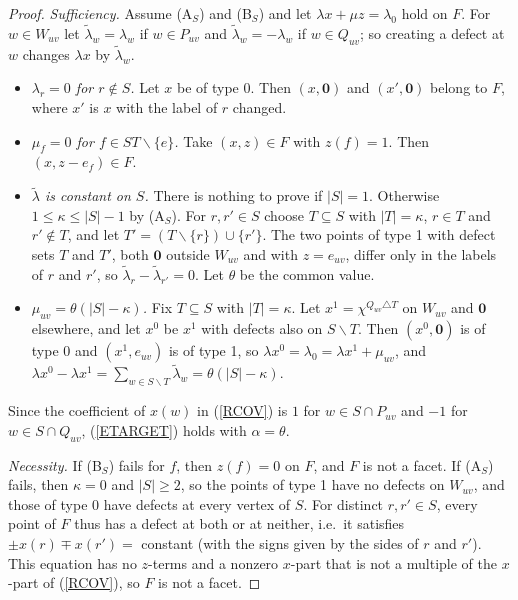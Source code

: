 \documentclass[a4paper,11pt]{article}
\newcommand{\ie}{{i.e.~}}
\theoremstyle{definition}
\begin{document}
\begin{proof}
\emph{Sufficiency.} Assume (A$_S$) and (B$_S$) and let $\lambda x + \mu z = \lambda_0$ hold on $F$. For $w \in W_{uv}$ let
$\tilde{\lambda}_w = \lambda_w$ if $w \in P_{uv}$ and $\tilde{\lambda}_w = -\lambda_w$ if $w \in Q_{uv}$; so creating a defect at $w$ changes $\lambda x$ by
$\tilde{\lambda}_w$.
\begin{itemize}
\item \emph{$\lambda_r = 0$ for $r \notin S$.} Let $x$ be of type 0. Then $(x, \mathbf{0})$ and $(x', \mathbf{0})$ belong to $F$, where $x'$ is $x$ with the label of
$r$ changed.
\item \emph{$\mu_f = 0$ for $f \in ST \backslash \{e\}$.} Take $(x, z) \in F$ with $z(f) = 1$. Then $(x, z - e_f) \in F$.
\item \emph{$\tilde{\lambda}$ is constant on $S$.} There is nothing to prove if $|S| = 1$. Otherwise $1 \leq \kappa \leq |S| - 1$ by (A$_S$). For
$r, r' \in S$ choose $T \subseteq S$ with $|T| = \kappa$, $r \in T$ and $r' \notin T$, and let $T' = (T \backslash \{r\}) \cup \{r'\}$. The two points of type 1
with defect sets $T$ and $T'$, both $\mathbf{0}$ outside $W_{uv}$ and with $z = e_{uv}$, differ only in the labels of $r$ and $r'$, so
$\tilde{\lambda}_r - \tilde{\lambda}_{r'} = 0$. Let $\theta$ be the common value.
\item \emph{$\mu_{uv} = \theta(|S| - \kappa)$.} Fix $T \subseteq S$ with $|T| = \kappa$. Let $x^1 = \chi^{Q_{uv} \triangle T}$ on $W_{uv}$ and $\mathbf{0}$ elsewhere,
and let $x^0$ be $x^1$ with defects also on $S \backslash T$. Then $(x^0, \mathbf{0})$ is of type 0 and $(x^1, e_{uv})$ is of type 1, so
$\lambda x^0 = \lambda_0 = \lambda x^1 + \mu_{uv}$, and $\lambda x^0 - \lambda x^1 = \sum_{w \in S \backslash T} \tilde{\lambda}_w = \theta(|S| - \kappa)$.
\end{itemize}
Since the coefficient of $x(w)$ in (\ref{RCOV}) is $1$ for $w \in S \cap P_{uv}$ and $-1$ for $w \in S \cap Q_{uv}$, (\ref{ETARGET}) holds with
$\alpha = \theta$.

\emph{Necessity.} If (B$_S$) fails for $f$, then $z(f) = 0$ on $F$, and $F$ is not a facet. If (A$_S$) fails, then $\kappa = 0$ and $|S| \geq 2$, so
the points of type 1 have no defects on $W_{uv}$, and those of type 0 have defects at every vertex of $S$. For distinct $r, r' \in S$, every point of
$F$ thus has a defect at both or at neither, \ie it satisfies $\pm x(r) \mp x(r') = $ constant (with the signs given by the sides of $r$ and $r'$).
This equation has no $z$-terms and a nonzero $x$-part that is not a multiple of the $x$-part of (\ref{RCOV}), so $F$ is not a facet.
\end{proof}
\end{document}
